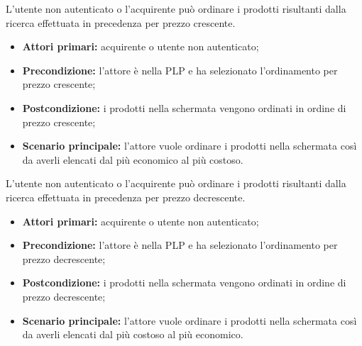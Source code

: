 
L'utente non autenticato o l'acquirente può ordinare i prodotti risultanti dalla ricerca effettuata in precedenza per prezzo crescente.
\begin{itemize}
    \item \textbf{Attori primari:} acquirente o utente non autenticato;
    \item \textbf{Precondizione:} l'attore è nella PLP e ha selezionato l'ordinamento per prezzo crescente;
    \item \textbf{Postcondizione:} i prodotti nella schermata vengono ordinati in ordine di prezzo crescente;
    \item \textbf{Scenario principale:} l'attore vuole ordinare i prodotti nella schermata così da averli elencati dal più economico al più costoso.
\end{itemize}

L'utente non autenticato o l'acquirente può ordinare i prodotti risultanti dalla ricerca effettuata in precedenza per prezzo decrescente.
\begin{itemize}
    \item \textbf{Attori primari:} acquirente o utente non autenticato;
    \item \textbf{Precondizione:} l'attore è nella PLP e ha selezionato l'ordinamento per prezzo decrescente;
    \item \textbf{Postcondizione:} i prodotti nella schermata vengono ordinati in ordine di prezzo decrescente;
    \item \textbf{Scenario principale:} l'attore vuole ordinare i prodotti nella schermata così da averli elencati dal più costoso al più economico.
\end{itemize}


